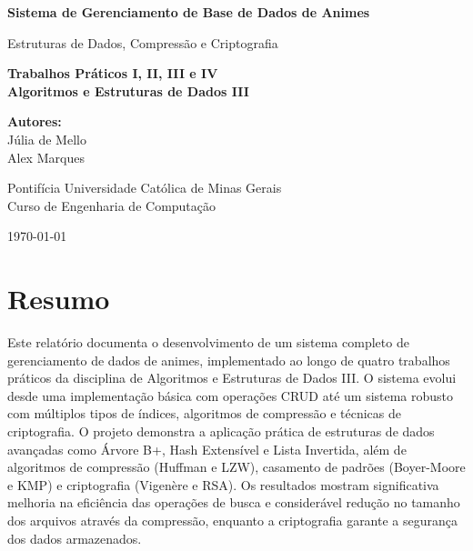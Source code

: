 \documentclass[12pt,a4paper]{article}
\let\oldsection\section
\renewcommand{\section}[1]{\needspace{4\baselineskip}\oldsection{#1}}
\begin{document}
\begin{titlepage}
    \begin{center}
        \vspace*{2cm}
        
        \Huge
        \textbf{Sistema de Gerenciamento de Base de Dados de Animes}
        
        \vspace{0.5cm}
        \LARGE
        Estruturas de Dados, Compressão e Criptografia
        
        \vspace{1.5cm}
        
        \textbf{Trabalhos Práticos I, II, III e IV}\\
        \textbf{Algoritmos e Estruturas de Dados III}
        
        \vspace{1.5cm}
        
        \textbf{Autores:}\\
        \large
        Júlia de Mello\\
        Alex Marques
        
        \vfill
        
        \vspace{0.8cm}
        
        \Large
        Pontifícia Universidade Católica de Minas Gerais\\
        Curso de Engenharia de Computação\\
        
        \vspace{1cm}
        
        \today
        
    \end{center}
\end{titlepage}

\tableofcontents
\thispagestyle{empty}
\newpage

\section{Resumo}

Este relatório documenta o desenvolvimento de um sistema completo de gerenciamento de dados de animes, implementado ao longo de quatro trabalhos práticos da disciplina de Algoritmos e Estruturas de Dados III. O sistema evolui desde uma implementação básica com operações CRUD até um sistema robusto com múltiplos tipos de índices, algoritmos de compressão e técnicas de criptografia. O projeto demonstra a aplicação prática de estruturas de dados avançadas como Árvore B+, Hash Extensível e Lista Invertida, além de algoritmos de compressão (Huffman e LZW), casamento de padrões (Boyer-Moore e KMP) e criptografia (Vigenère e RSA). Os resultados mostram significativa melhoria na eficiência das operações de busca e considerável redução no tamanho dos arquivos através da compressão, enquanto a criptografia garante a segurança dos dados armazenados.
\end{document}
